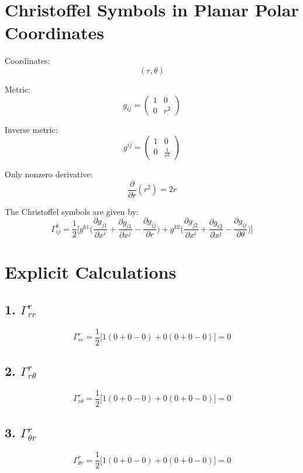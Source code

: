 \documentclass{article}
\begin{document}
	
	\section*{Christoffel Symbols in Planar Polar Coordinates}
	
	Coordinates:
	\[
	(r,\theta)
	\]
	
	Metric:
	\[
	g_{ij} =
	\begin{pmatrix}
		1 & 0 \\
		0 & r^2
	\end{pmatrix}
	\]
	
	Inverse metric:
	\[
	g^{ij} =
	\begin{pmatrix}
		1 & 0 \\
		0 & \frac{1}{r^2}
	\end{pmatrix}
	\]
	
	Only nonzero derivative:
	\[
	\frac{\partial}{\partial r}(r^2)=2r
	\]
	
	The Christoffel symbols are given by:
	\[
	\Gamma^k_{ij}
	=
	\frac{1}{2}\Bigg[
	g^{k1}\Big(
	\frac{\partial g_{j1}}{\partial x^i}
	+
	\frac{\partial g_{i1}}{\partial x^j}
	-
	\frac{\partial g_{ij}}{\partial r}
	\Big)
	+
	g^{k2}\Big(
	\frac{\partial g_{j2}}{\partial x^i}
	+
	\frac{\partial g_{i2}}{\partial x^j}
	-
	\frac{\partial g_{ij}}{\partial \theta}
	\Big)
	\Bigg]
	\]
	
	\section*{Explicit Calculations}
	
	\subsection*{1. $\Gamma^r_{rr}$}
	
	\[
	\Gamma^r_{rr}
	=
	\frac{1}{2}\Big[
	1(0+0-0) + 0(0+0-0)
	\Big]
	=0
	\]
	
	\subsection*{2. $\Gamma^r_{r\theta}$}
	
	\[
	\Gamma^r_{r\theta}
	=
	\frac{1}{2}\Big[
	1(0+0-0) + 0(0+0-0)
	\Big]
	=0
	\]
	
	\subsection*{3. $\Gamma^r_{\theta r}$}
	
	\[
	\Gamma^r_{\theta r}
	=
	\frac{1}{2}\Big[
	1(0+0-0) + 0(0+0-0)
	\Big]
	=0
	\]
	
\end{document}
